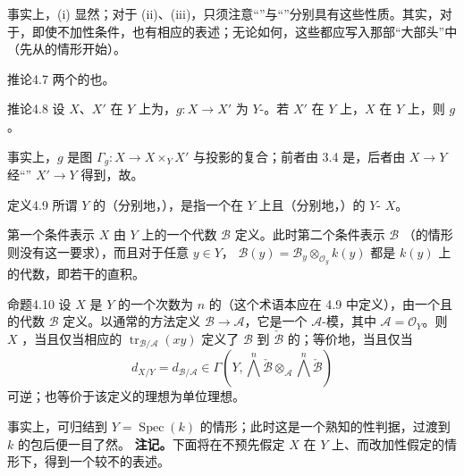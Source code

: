 事实上，(i) 显然；对于 (ii)、(iii)，只须注意“”与“”分别具有这些性质。其实，对于，即使不加性条件，也有相应的表述；无论如何，这些都应写入那部“大部头”中（先从的情形开始）。
\begin{SGAresult}{推论}{4.7}
两个的也。
\end{SGAresult}
\begin{SGAresult}{推论}{4.8}
设 $X$、$X'$ 在 $Y$ 上为，$g\colon X\to X'$ 为 $Y$-。若 $X'$ 在 $Y$ 上，$X$ 在 $Y$ 上，则 $g$ 。
\end{SGAresult}
事实上，$g$ 是图 $\Gamma_g\colon X\to X\times_Y X'$ 与投影的复合；前者由 3.4 是，后者由 $X\to Y$ 经“” $X'\to Y$ 得到，故。

\begin{SGAresult}{定义}{4.9}
所谓 $Y$ 的（分别地，），是指一个在 $Y$ 上且（分别地，）的 $Y$- $X$。
\end{SGAresult}
第一个条件表示 $X$ 由 $Y$ 上的一个代数 $\mathcal B$ 定义。此时第二个条件表示 $\mathcal B$ （的情形则没有这一要求），而且对于任意 $y\in Y$， $\mathcal B(y)=\mathcal B_y\otimes_{\mathcal O_y}k(y)$ 都是 $k(y)$ 上的代数，即若干的直积。
\begin{SGAresult}{命题}{4.10}
设 $X$ 是 $Y$ 的一个次数为 $n$ 的（这个术语本应在 4.9 中定义），由一个且的代数 $\mathcal B$ 定义。以通常的方法定义 $\mathcal B\to\mathcal A$，它是一个 $\mathcal A$-模，其中 $\mathcal A=\mathcal O_Y$。则 $X$ ，当且仅当相应的 $\operatorname{tr}_{\mathcal B/\mathcal A}(xy)$ 定义了 $\mathcal B$ 到 $\check{\mathcal B}$ 的；等价地，当且仅当
\[
 d_{X/Y}=d_{\mathcal B/\mathcal A}
 \in\Gamma\!\left(Y,\bigwedge^n\check{\mathcal B}\otimes_{\mathcal A}\bigwedge^n\check{\mathcal B}\right)
\]
可逆；也等价于该定义的理想为单位理想。
\end{SGAresult}
事实上，可归结到 $Y=\operatorname{Spec}(k)$ 的情形；此时这是一个熟知的性判据，过渡到 $k$ 的包后便一目了然。
\textbf{注记。}下面将在不预先假定 $X$ 在 $Y$ 上、而改加性假定的情形下，得到一个较不的表述。

